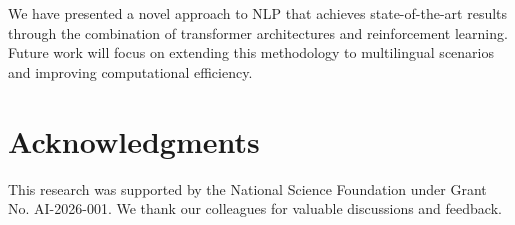 \documentclass{article}
\begin{document}
We have presented a novel approach to NLP that achieves state-of-the-art results through the combination of transformer architectures and reinforcement learning. Future work will focus on extending this methodology to multilingual scenarios and improving computational efficiency.

\section{Acknowledgments}

This research was supported by the National Science Foundation under Grant No. AI-2026-001. We thank our colleagues for valuable discussions and feedback.
\end{document}
